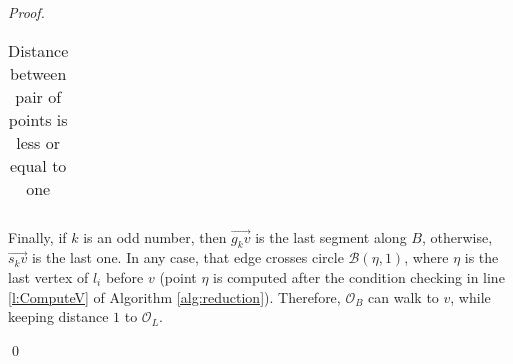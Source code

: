 \documentclass[a4paper,UKenglish]{lipics}
\newcommand{\CB}{{\mathscr B}}
\newcommand{\CS}{{\mathscr S}}
\newcommand{\CO}{{\mathscr O}}
\newcommand{\CQ}{{\mathscr Q}}
\newcommand{\cfev}{{l}} \newcommand{\sq}{{\CS\CQ}}
\newcommand{\Dir}{\overrightarrow}
\begin{document}
\begin{proof}
\begin{table}[h]
\begin{tabular}{ r | l | l  }
\end{tabular}
\caption{Distance between pair of points is less or equal to one}
\label{tab:PathB}
\end{table}



Finally, if $k$ is an odd number, then  
$\Dir{g_kv}$ is the last segment along $B$, otherwise, 
$\Dir{s_kv}$ is the last one. In any case, 
that edge crosses  circle $\CB(\eta,1)$, where $\eta$ is the last vertex of 
$\cfev_i$ before $v$ (point $\eta$ is computed after the condition checking 
in line \ref{l:ComputeV} of 
Algorithm \ref{alg:reduction}). Therefore, 
 $\CO_B$ can walk to $v$, while keeping distance $1$ to $\CO_L$. 


\qed
\end{proof}
\end{document}
